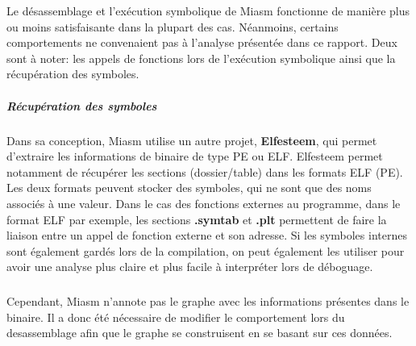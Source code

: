 Le désassemblage et l'exécution symbolique de Miasm fonctionne de manière plus ou moins satisfaisante dans la plupart des cas. Néanmoins,
certains comportements ne convenaient pas à l'analyse présentée dans ce rapport. Deux sont à noter: les appels de fonctions lors de l'exécution symbolique ainsi que
la récupération des symboles.
\subparagraph{Récupération des symboles}
Dans sa conception, Miasm utilise un autre projet, \textbf{Elfesteem}, qui permet d'extraire les informations de binaire de type PE ou ELF. Elfesteem permet notamment
de récupérer les sections (dossier/table) dans les formats ELF (PE). Les deux formats peuvent stocker des symboles, qui ne sont que des noms associés à une valeur.
Dans le cas des fonctions externes au programme, dans le format ELF par exemple, les sections \textbf{.symtab} et \textbf{.plt} permettent de faire la liaison entre un appel de fonction
externe et son adresse. Si les symboles internes sont également gardés lors de la compilation, on peut également les utiliser pour avoir une analyse plus claire et plus facile à interpréter lors
de déboguage.
\subparagraph{}
Cependant, Miasm n'annote pas le graphe avec les informations présentes dans le binaire. Il a donc été nécessaire de modifier le comportement lors du desassemblage afin que le graphe se construisent
en se basant sur ces données.

